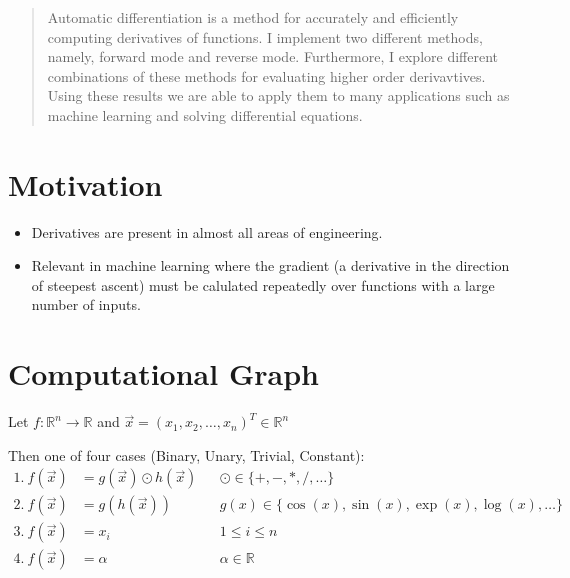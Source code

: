 \documentclass[a0,landscape]{a0poster}
\begin{document}
\vspace{1cm} %


\begin{multicols}{4} %


\begin{abstract}
    Automatic differentiation is a method for accurately and efficiently
    computing derivatives of functions. I implement two different methods, namely,
    forward mode and reverse mode. Furthermore, I explore different combinations
    of these methods for evaluating higher order derivavtives. Using these results we are able to
    apply them to many applications such as machine learning and solving differential
    equations.
\end{abstract}


\section*{Motivation}
\begin{itemize}[noitemsep]
\item Derivatives are present in almost all areas of engineering.
\item Relevant in machine learning where the gradient (a derivative
    in the direction of steepest ascent) must be calulated repeatedly
    over functions with a large number of inputs.
\end{itemize}
\section*{Computational Graph}
    Let $f:\mathbb{R}^n\rightarrow\mathbb{R}$ and $\vec{x}=(x_1,x_2,\dots,x_n)^T\in\mathbb{R}^n$

    Then one of four cases (Binary, Unary, Trivial, Constant):
\begin{align*}
    1.\ f(\vec{x})&=g(\vec{x})\odot h(\vec{x}) &&\odot\in\{+,-,*,/,\dots\} \\
    2.\ f(\vec{x})&=g(h(\vec{x})) &&g(x)\in\{\cos{(x)},\sin{(x)},\exp{(x)},\log{(x)},\dots\} \\
    3.\ f(\vec{x})&=x_i &&1\leq i\leq n \\
    4.\ f(\vec{x})&=\alpha &&\alpha\in\mathbb{R}
\end{align*}


\end{multicols}
\end{document}
